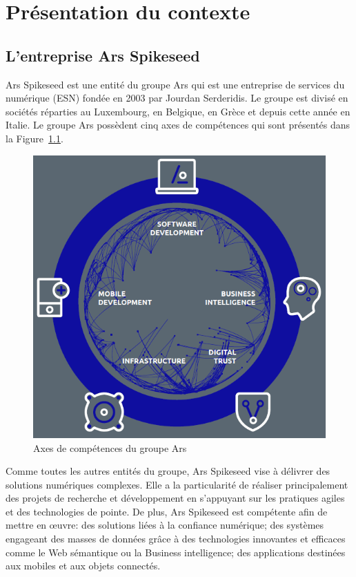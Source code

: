 \documentclass{tnreport}
\begin{document}
\chapter{Présentation du contexte}

\section{L'entreprise Ar{\texteta}s Spikeseed}

Ar{\texteta}s Spikeseed est une entité du groupe Ar{\texteta}s qui est une entreprise de services du numérique (ESN) fondée en 2003 par Jourdan Serderidis. 
Le groupe est divisé en sociétés réparties au Luxembourg, en Belgique, en Grèce et depuis cette année en Italie. Le groupe Ar{\texteta}s possèdent cinq axes de compétences qui sont présentés dans la Figure~\ref{fig:arhs-core-services}.

\begin{figure}[h]
	\centering
	\includegraphics{figures/arhs-core-services}
	\caption{Axes de compétences du groupe Ar{\texteta}s \cite{annual-report}}
	\label{fig:arhs-core-services}
\end{figure}

Comme toutes les autres entités du groupe, Ar{\texteta}s Spikeseed vise à délivrer des solutions numériques complexes. Elle a la particularité de réaliser principalement des projets de recherche et développement en s'appuyant sur les pratiques agiles et des technologies de pointe. 
De plus, Ar{\texteta}s Spikeseed est compétente afin de mettre en œuvre: 
des solutions liées à la confiance numérique; 
des systèmes engageant des masses de données grâce à des technologies innovantes et efficaces comme le Web sémantique ou la Business intelligence; 
des applications destinées aux mobiles et aux objets connectés.
\end{document}
